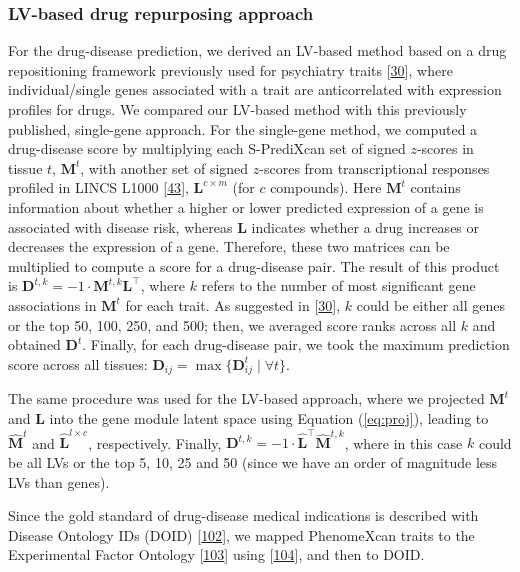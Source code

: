 \documentclass[
        11pt,
]{article}
\begin{document}
\hypertarget{sec:methods:drug}{%
\subsubsection{LV-based drug repurposing approach}\label{sec:methods:drug}}

For the drug-disease prediction, we derived an LV-based method based on a drug repositioning framework previously used for psychiatry traits {[}\protect\hyperlink{ref-17oeJ0CXy}{30}{]}, where individual/single genes associated with a trait are anticorrelated with expression profiles for drugs.
We compared our LV-based method with this previously published, single-gene approach.
For the single-gene method, we computed a drug-disease score by multiplying each S-PrediXcan set of signed \(z\)-scores in tissue \(t\), \(\mathbf{M}^t\), with another set of signed \(z\)-scores from transcriptional responses profiled in LINCS L1000 {[}\protect\hyperlink{ref-F7lIlh2N}{43}{]}, \(\mathbf{L}^{c \times m}\) (for \(c\) compounds).
Here \(\mathbf{M}^t\) contains information about whether a higher or lower predicted expression of a gene is associated with disease risk, whereas \(\mathbf{L}\) indicates whether a drug increases or decreases the expression of a gene.
Therefore, these two matrices can be multiplied to compute a score for a drug-disease pair.
The result of this product is \(\mathbf{D}^{t,k}=-1 \cdot \mathbf{M}^{t,k} \mathbf{L}^\top\), where \(k\) refers to the number of most significant gene associations in \(\mathbf{M}^t\) for each trait.
As suggested in {[}\protect\hyperlink{ref-17oeJ0CXy}{30}{]}, \(k\) could be either all genes or the top 50, 100, 250, and 500; then, we averaged score ranks across all \(k\) and obtained \(\mathbf{D}^t\).
Finally, for each drug-disease pair, we took the maximum prediction score across all tissues: \(\mathbf{D}_{ij} = \max \{ \mathbf{D}_{ij}^t \mid \forall t \}\).

The same procedure was used for the LV-based approach, where we projected \(\mathbf{M}^{t}\) and \(\mathbf{L}\) into the gene module latent space using Equation (\ref{eq:proj}), leading to \(\hat{\mathbf{M}}^t\) and \(\hat{\mathbf{L}}^{l \times c}\), respectively.
Finally, \(\mathbf{D}^{t,k}=-1 \cdot \hat{\mathbf{L}}^{\top} \hat{\mathbf{M}}^{t,k}\), where in this case \(k\) could be all LVs or the top 5, 10, 25 and 50 (since we have an order of magnitude less LVs than genes).

Since the gold standard of drug-disease medical indications is described with Disease Ontology IDs (DOID) {[}\protect\hyperlink{ref-1FsruosUW}{102}{]}, we mapped PhenomeXcan traits to the Experimental Factor Ontology {[}\protect\hyperlink{ref-9okjVu3s}{103}{]} using {[}\protect\hyperlink{ref-16RTdMKxI}{104}{]}, and then to DOID.
\end{document}
